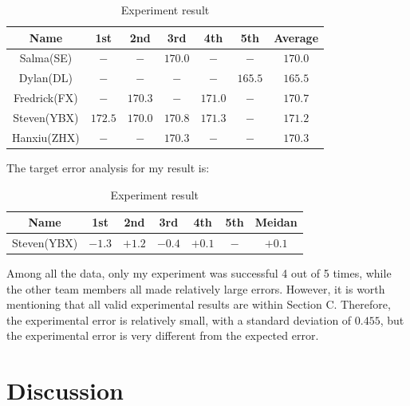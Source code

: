 \documentclass{article}
\begin{document}
    \begin{table}[H]
        \caption {Experiment result} \label{tb:e_result} 
        \begin{center}
            \begin{tabular}{ccccccc}
                \hline
                Name & 1st & 2nd & 3rd & 4th & 5th & Average \\
                \hline
                Salma(SE)       &$-$        &$-$        &$170.0$    &$-$        &$-$        &$170.0$        \\
                Dylan(DL)       &$-$        &$-$        &$-$        &$-$        &$165.5$    &$165.5$        \\
                Fredrick(FX)    &$-$        &$170.3$    &$-$        &$171.0$        &$-$    &$170.7$        \\
                Steven(YBX)     &$172.5$    &$170.0$    &$170.8$    &$171.3$    &$-$        &$171.2$        \\
                Hanxiu(ZHX)     &$-$        &$-$        &$170.3$   &$-$        &$-$        &$170.3$       \\
                \hline
            \end{tabular}
        \end{center}
    \end{table}
    The target error analysis for my result is:
    \begin{table}[H]
        \caption {Experiment result} \label{tb:e_result} 
        \begin{center}
            \begin{tabular}{ccccccc}
                \hline
                Name & 1st & 2nd & 3rd & 4th & 5th & Meidan \\
                \hline
                Steven(YBX) & $-1.3$   & $+1.2$  & $-0.4$   & $+0.1$ & $-$     & $+0.1$         \\
                \hline
            \end{tabular}
        \end{center}
    \end{table}
    Among all the data, only my experiment was successful 4 out of 5 times, while the other team members all made relatively large errors. However, it is worth mentioning that all valid experimental results are within Section C. Therefore, the experimental error is relatively small, with a standard deviation of $0.455$, but the experimental error is very different from the expected error.
\section{Discussion}
\end{document}
